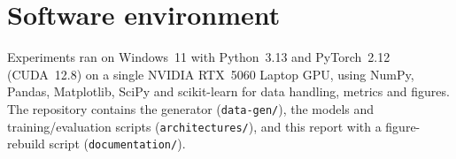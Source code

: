 \section{Software environment}
\label{app:env}

Experiments ran on Windows~11 with Python~3.13 and PyTorch~2.12 (CUDA~12.8) on a
single NVIDIA RTX~5060 Laptop GPU, using NumPy, Pandas, Matplotlib, SciPy and
scikit-learn for data handling, metrics and figures. The repository contains the
generator (\texttt{data-gen/}), the models and training/evaluation scripts
(\texttt{architectures/}), and this report with a figure-rebuild script
(\texttt{documentation/}).
